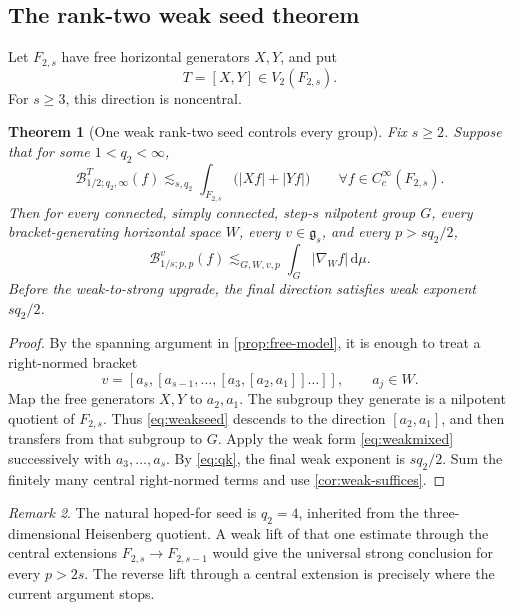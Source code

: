 \documentclass[11pt]{article}
\newtheorem{theorem}{Theorem}[section]
\theoremstyle{definition}
\theoremstyle{remark}
\newtheorem{remark}[theorem]{Remark}
\newcommand{\g}{\mathfrak g}
\newcommand{\dd}{\,\mathrm d}
\newcommand{\abs}[1]{\lvert #1\rvert}
\newcommand{\B}[4]{\mathcal B^{#1}_{#2;#3,#4}}
\newcommand{\Bw}[3]{\mathcal B^{#1}_{#2;#3,\infty}}
\newcommand{\less}{\lesssim}
\begin{document}
\subsection{The rank-two weak seed theorem}

Let \(F_{2,s}\) have free horizontal generators \(X,Y\), and put
\begin{equation}\label{eq:Tseed}
 T=[X,Y]\in V_2(F_{2,s}).
\end{equation}
For \(s\ge3\), this direction is noncentral.

\begin{theorem}[One weak rank-two seed controls every group]\label{thm:ranktwo}
Fix \(s\ge2\).  Suppose that for some \(1<q_2<\infty\),
\begin{equation}\label{eq:weakseed}
 \Bw{T}{1/2}{q_2}(f)
 \less_{s,q_2}\int_{F_{2,s}}\bigl(\abs{Xf}+\abs{Yf}\bigr)
 \qquad\forall f\in C_c^\infty(F_{2,s}).
\end{equation}
Then for every connected, simply connected, step-\(s\) nilpotent group \(G\), every
bracket-generating horizontal space \(W\), every \(v\in\g_s\), and every \(p>sq_2/2\),
\begin{equation}\label{eq:ranktwo-output}
 \B{v}{1/s}{p}{p}(f)\less_{G,W,v,p}\int_G\abs{\nabla_Wf}\dd\mu.
\end{equation}
Before the weak-to-strong upgrade, the final direction satisfies weak exponent
\(sq_2/2\).
\end{theorem}

\begin{proof}
By the spanning argument in \cref{prop:free-model}, it is enough to treat a
right-normed bracket
\[
 v=[a_s,[a_{s-1},\ldots,[a_3,[a_2,a_1]]\ldots]],\qquad a_j\in W.
\]
Map the free generators \(X,Y\) to \(a_2,a_1\).  The subgroup they generate is a
nilpotent quotient of \(F_{2,s}\).  Thus \eqref{eq:weakseed} descends to the direction
\([a_2,a_1]\), and then transfers from that subgroup to \(G\).  Apply the weak form
\eqref{eq:weakmixed} successively with \(a_3,\ldots,a_s\).  By
\eqref{eq:qk}, the final weak exponent is \(sq_2/2\).  Sum the finitely many central
right-normed terms and use \cref{cor:weak-suffices}.
\end{proof}

\begin{remark}
The natural hoped-for seed is \(q_2=4\), inherited from the three-dimensional Heisenberg
quotient.  A weak lift of that one estimate through the central extensions
\(F_{2,s}\to F_{2,s-1}\) would give the universal strong conclusion for every
\(p>2s\).  The reverse lift through a central extension is precisely where the current
argument stops.
\end{remark}
\end{document}
